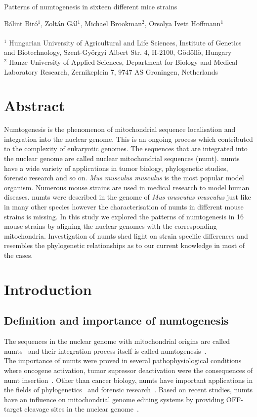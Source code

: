 \documentclass[a4paper,12pt]{article}
\numberwithin{equation}{section} %
\begin{document}
\begin{center}
	\Large{Patterns of numtogenesis in sixteen different mice strains}
\end{center}
\small{Bálint Biró$^1$, Zoltán Gál$^1$, Michael Brookman$^2$, Orsolya Ivett Hoffmann$^1$}\\ \\
\scriptsize{$^1$ Hungarian University of Agricultural and Life Sciences, Institute of Genetics and Biotechnology, Szent-Györgyi Albert Str. 4, H-2100, Gödöllö, Hungary\\
$^2$ Hanze University of Applied Sciences, Department for Biology and Medical Laboratory Research, Zernikeplein 7, 9747 AS Groningen, Netherlands}

\normalsize
\section{Abstract}
\indent Numtogenesis is the phenomenon of mitochondrial sequence localisation and integration into the nuclear genome. This is an ongoing process which contributed to the complexity of eukaryotic genomes. The sequences that are integrated into the nuclear genome are called nuclear mitochondrial sequences (numt). numts have a wide variety of applications in tumor biology, phylogenetic studies, forensic research and so on. \textit{Mus musculus musculus} is the most popular model organism. Numerous mouse strains are used in medical research to model human diseases. numts were described in the genome of  \textit{Mus musculus musculus} just like in many other species however the characterisation of  numts in different mouse strains is missing. In this study we explored the patterns of numtogenesis in 16 mouse strains by aligning the nuclear genomes with the corresponding mitochondria. Investigation of numts shed light on strain specific differences and resembles the phylogenetic relationships as to our current knowledge in most of the cases.
\section{Introduction}
\subsection{Definition and importance of numtogenesis}
\indent The sequences in the nuclear genome with mitochondrial origins are called numts~ and their integration process itself is called numtogenesis~. \\ \indent The importance of numts were proved in several pathophysiological conditions where oncogene activation, tumor supressor deactivation were the consequences of numt insertion~. Other than cancer biology, numts have important applications in the fields of phylogenetics~ and forensic research~. Based on recent studies, numts have an influence on mitochondrial genome editing systems by providing OFF-target cleavage sites in the nuclear genome~.
\end{document}
